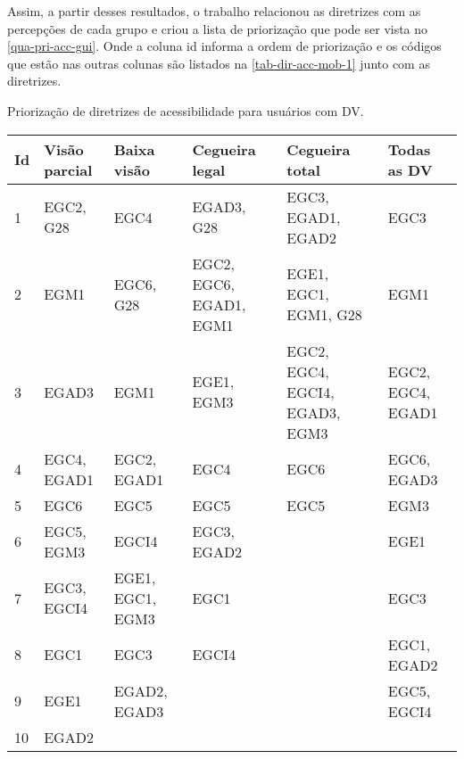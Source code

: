 Assim, a partir desses resultados, o trabalho relacionou as diretrizes com as percepções de cada grupo
e criou a lista de priorização que pode ser vista no \autoref{qua-pri-acc-gui}.
Onde a coluna id informa a ordem de priorização e os códigos que estão nas outras colunas são listados na \autoref{tab-dir-acc-mob-1} junto com as diretrizes.

\begin{quadro}[htb!]
  \begin{center}
    \ABNTEXfontereduzida
    \caption{\label{qua-pri-acc-gui}Priorização de diretrizes de acessibilidade para usuários com DV.}
    \begin{tabular}{|m{0.5cm} | m{2.4cm} | m{2.4cm} | m{2.8cm} | m{3.0cm} | m{2.4cm}|}
      \hline
      \textbf{Id} & \textbf{Visão parcial} & \textbf{Baixa visão} & \textbf{Cegueira legal} & \textbf{Cegueira total}        & \textbf{Todas as DV} \\
      \hline
      1           & EGC2, G28              & EGC4                 & EGAD3, G28              & EGC3, EGAD1, EGAD2             & EGC3                 \\
      \hline
      2           & EGM1                   & EGC6, G28            & EGC2, EGC6, EGAD1, EGM1 & EGE1, EGC1, EGM1, G28          & EGM1                 \\
      \hline
      3           & EGAD3                  & EGM1                 & EGE1, EGM3              & EGC2, EGC4, EGCI4, EGAD3, EGM3 & EGC2, EGC4, EGAD1    \\
      \hline
      4           & EGC4, EGAD1            & EGC2, EGAD1          & EGC4                    & EGC6                           & EGC6, EGAD3          \\
      \hline
      5           & EGC6                   & EGC5                 & EGC5                    & EGC5                           & EGM3                 \\
      \hline
      6           & EGC5, EGM3             & EGCI4                & EGC3, EGAD2             & \-                             & EGE1                 \\
      \hline
      7           & EGC3, EGCI4            & EGE1, EGC1, EGM3     & EGC1                    & \-                             & EGC3                 \\
      \hline
      8           & EGC1                   & EGC3                 & EGCI4                   & \-                             & EGC1, EGAD2          \\
      \hline
      9           & EGE1                   & EGAD2, EGAD3         & \-                      & \-                             & EGC5, EGCI4          \\
      \hline
      10          & EGAD2                  & \-                   & \-                      & \-                             & \-                   \\
      \hline
    \end{tabular}
  \end{center}
\end{quadro}

